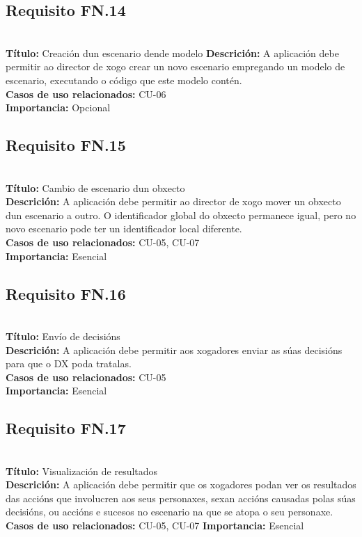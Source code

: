 \subsection{Requisito FN.14}~\\
{\bf Título:} Creación dun escenario dende modelo
{\bf Descrición:} A aplicación debe permitir ao director de xogo crear un novo
escenario empregando un modelo de escenario, executando o código que este modelo contén.\\
{\bf Casos de uso relacionados:} CU-06\\
{\bf Importancia:} Opcional

\subsection{Requisito FN.15}~\\
{\bf Título:} Cambio de escenario dun obxecto\\
{\bf Descrición:} A aplicación debe permitir ao director de xogo mover un
obxecto dun escenario a outro. O identificador global do obxecto permanece
igual, pero no novo escenario pode ter un identificador local diferente.\\
{\bf Casos de uso relacionados:} CU-05, CU-07\\
{\bf Importancia:} Esencial

\subsection{Requisito FN.16}~\\
{\bf Título:} Envío de decisións\\
{\bf Descrición:} A aplicación debe permitir aos xogadores enviar as súas
decisións para que o DX poda tratalas.\\
{\bf Casos de uso relacionados:} CU-05\\
{\bf Importancia:} Esencial

\subsection{Requisito FN.17}~\\
{\bf Título:} Visualización de resultados\\
{\bf Descrición:} A aplicación debe permitir que os xogadores podan ver os
resultados das accións que involucren aos seus personaxes, sexan accións
causadas polas súas decisións, ou accións e sucesos no escenario na que se atopa
o seu personaxe.
{\bf Casos de uso relacionados:} CU-05, CU-07
{\bf Importancia:} Esencial



